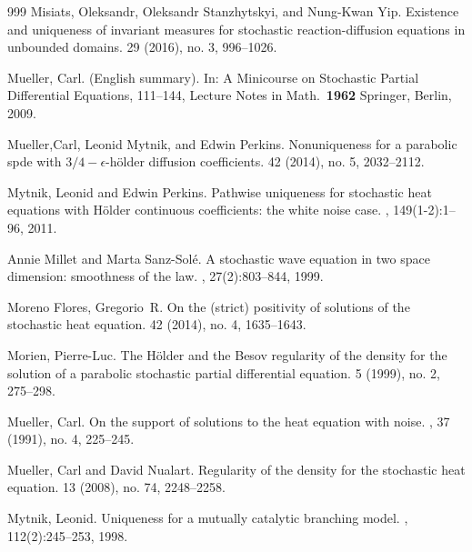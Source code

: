\documentclass[a4paper,12pt]{article}
\theoremstyle{plain}
\theoremstyle{definition}
\begin{document}
\begin{thebibliography}{999}
Misiats, Oleksandr, Oleksandr Stanzhytskyi, and Nung-Kwan Yip.
\newblock Existence and uniqueness of invariant measures for stochastic reaction-diffusion equations in unbounded domains. 
 29 (2016), no. 3, 996--1026. 
 

Mueller, Carl.
 (English summary).
\newblock In: A Minicourse on Stochastic Partial Differential Equations, 111--144,
\newblock Lecture Notes in Math.\ {\bf 1962} Springer, Berlin, 2009.

Mueller,Carl, Leonid Mytnik, and Edwin Perkins.
\newblock Nonuniqueness for a parabolic spde with $3/4 -\epsilon$-hölder diffusion coefficients.
 42 (2014), no. 5, 2032--2112. 

Mytnik, Leonid and Edwin Perkins.
\newblock Pathwise uniqueness for stochastic heat equations with {H}\"older continuous coefficients: the white noise case.
, 149(1-2):1--96, 2011.

Annie Millet and Marta Sanz-Sol{\'e}.
\newblock A stochastic wave equation in two space dimension: smoothness of the law.
, 27(2):803--844, 1999.

Moreno Flores, Gregorio~R.
\newblock On the (strict) positivity of solutions of the stochastic heat equation. 
  42 (2014), no. 4, 1635--1643.

Morien, Pierre-Luc.
\newblock The H\"older and the Besov regularity of the density for the solution 
of a parabolic stochastic partial differential equation. 
 5 (1999), no. 2, 275--298.


Mueller, Carl.
\newblock On the support of solutions to the heat equation with noise.
, 37 (1991), no. 4, 225--245. 

Mueller, Carl and David Nualart.
\newblock Regularity of the density for the stochastic heat equation.
 13 (2008), no. 74, 2248--2258.

Mytnik, Leonid.
\newblock Uniqueness for a mutually catalytic branching model.
, 112(2):245--253, 1998.


\end{thebibliography}
\end{document}
